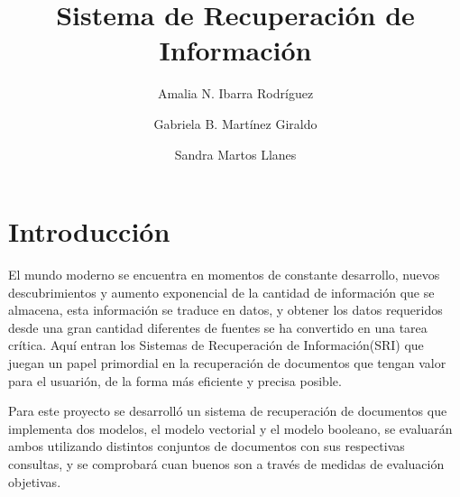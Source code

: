 \documentclass[runningheads,a4paper]{llncs}
\begin{document}
\mainmatter  %

\title{Sistema de Recuperaci\'on de Informaci\'on}


%
%
\author{Amalia N. Ibarra Rodr\'iguez%
\and Gabriela B. Mart\'inez Giraldo 
\and Sandra Martos Llanes}
%


%

\maketitle




 
\section{Introducci\'on}
El mundo moderno se encuentra en momentos de constante desarrollo, nuevos descubrimientos y aumento exponencial de la cantidad de informaci\'on que se almacena, esta informaci\'on se traduce en datos, y obtener los datos requeridos desde una gran cantidad diferentes de fuentes se ha convertido en una tarea cr\'itica. Aqu\'i entran los Sistemas de Recuperaci\'on de Informaci\'on(SRI) que juegan un papel primordial en la recuperaci\'on de documentos que tengan valor para el usuari\'on, de la forma m\'as eficiente y precisa posible.

Para este proyecto se desarroll\'o un sistema de recuperaci\'on de documentos que implementa dos modelos, el modelo vectorial y el modelo booleano, se evaluar\'an ambos utilizando distintos conjuntos de documentos con sus respectivas consultas, y se comprobar\'a cuan buenos son a trav\'es de medidas de evaluaci\'on objetivas.
\end{document}
